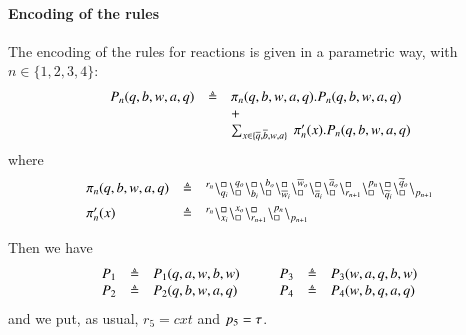 \paragraph{Encoding of the rules}
The encoding of the rules for reactions is  given in a parametric way, {\color{red} with $n \in \{1,2,3,4\}$}:
\[
\begin{array}{lcl}
P_n(q,b,w,a,q) & \triangleq & \pi_n(q,b,w,a,q).P_n(q,b,w,a,q)  \\
			&& +\\
			&& \sum_{x\in\{\overline{q},\overline{b},w,a\}}\ \pi'_n(x).P_n(q,b,w,a,q)\\
			\end{array}
			\]
			\noindent
			where
			\[
\begin{array}{lcl}
\pi_n(q,b,w,a,q) &\triangleq & {}^{r_n}\backslash_{q_i}^{\scriptstyle {\square}}\backslash_{\scriptstyle {\square}}^{q_o}
                                                    \backslash_{b_i}^{\scriptstyle {\square}}\backslash_{\scriptstyle {\square}}^{b_o}
                                                     \backslash_{\overline{w}_i}^{\scriptstyle {\square}}\backslash_{\scriptstyle {\square}}^{\overline{w}_o}
					        \backslash_{\overline{a}_i}^{\scriptstyle {\square}}\backslash_{\scriptstyle {\square}}^{\overline{a}_o}
					        \backslash_{r_{n+1}}^{\scriptstyle {\square}}\backslash_{\scriptstyle {\square}}^{p_n}
					        \backslash_{\widetilde{q}_i}^{\scriptstyle {\square}}\backslash_{\scriptstyle {\square}}^{\widetilde{q}_o}
			\backslash_{p_{n+1}}^{}\\[6pt]
\pi'_n(x) &\triangleq &  {}^{r_n}\backslash_{x_i}^{\scriptstyle {\square}}\backslash_{\scriptstyle {\square}}^{x_o}\backslash_{r_{n+1}}^{\scriptstyle {\square}}\backslash_{\scriptstyle {\square}}^{p_n} \backslash_{p_{n+1}}^{} 
\end{array}
\]

Then we have 
\[
\begin{array}{lcl @{\hspace{1cm}}lcl  }
P_1 & \defeq & P_1(q,a,w,b,w) & P_3 & \defeq & P_3(w,a,q,b,w)  \\
P_2 & \defeq & P_2(q,b,w,a,q) &P_4 & \defeq & P_4(w,b,q,a,q) 
\end{array}
\]
and we put, as usual,
$r_5 = \mathit{cxt}$ and  $p_5 = \tau$.

